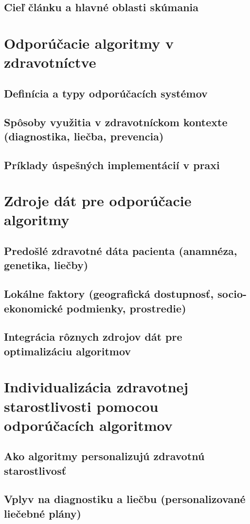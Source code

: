 \documentclass[10pt,twoside,,a4paper]{article}
\begin{document}
\subsection{Cieľ článku a hlavné oblasti skúmania}
\section{Odporúčacie algoritmy v zdravotníctve}
\subsection{Definícia a typy odporúčacích systémov}
\subsection{Spôsoby využitia v zdravotníckom kontexte (diagnostika, liečba, prevencia)}
\subsection{Príklady úspešných implementácií v praxi}
\section{Zdroje dát pre odporúčacie algoritmy}
\subsection{Predošlé zdravotné dáta pacienta (anamnéza, genetika, liečby)}
\subsection{Lokálne faktory (geografická dostupnosť, socio-ekonomické podmienky, prostredie)}
\subsection{Integrácia rôznych zdrojov dát pre optimalizáciu algoritmov}
\section{Individualizácia zdravotnej starostlivosti pomocou odporúčacích algoritmov}
\subsection{Ako algoritmy personalizujú zdravotnú starostlivosť}
\subsection{Vplyv na diagnostiku a liečbu (personalizované liečebné plány)}
\end{document}
